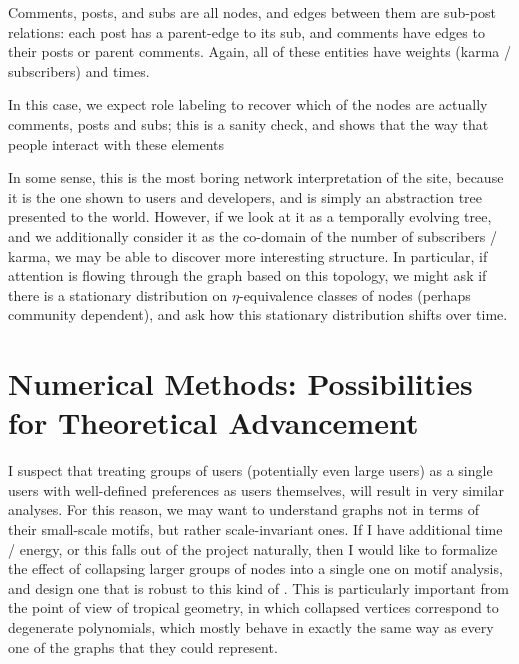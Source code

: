 \documentclass{amsart}
\begin{document}
	Comments, posts, and subs are all nodes, and edges between them are sub-post relations: each post has a parent-edge to its sub, and comments have edges to their posts or parent comments. Again, all of these entities have weights (karma / subscribers) and times. 
	
	In this case, we expect role labeling to recover which of the nodes are actually comments, posts and subs; this is a sanity check, and shows that the way that people interact with these elements 
	
	In some sense, this is the most boring network interpretation of the site, because it is the one shown to users and developers, and is simply an abstraction tree presented to the world. However, if we look at it as a temporally evolving tree, and we additionally consider it as the co-domain of the number of subscribers / karma, we may be able to discover more interesting structure. In particular, if attention is flowing through the graph based on this topology, we might ask if there is a stationary distribution on $\eta$-equivalence classes of nodes (perhaps community dependent), and ask how this stationary distribution shifts over time.

	
	\section{Numerical Methods: Possibilities for Theoretical Advancement}
	
	I suspect that treating groups of users (potentially even large users) as a single users with well-defined preferences as users themselves, will result in very similar analyses. For this reason, we may want to understand graphs not in terms of their small-scale motifs, but rather scale-invariant ones. If I have additional time / energy, or this falls out of the project naturally, then I would like to formalize the effect of collapsing larger groups of nodes into a single one on motif analysis, and design one that is robust to this kind of . This is particularly important from the point of view of tropical geometry, in which collapsed vertices correspond to degenerate polynomials, which mostly behave in exactly the same way as every one of the graphs that they could represent.
	
\end{document}
